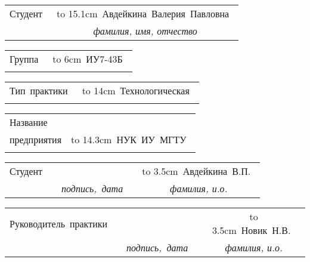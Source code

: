 {
\noindent
\begin{tabular}{@{}l@{}c}
    Студент~       & \hbox to 15.1cm{\hfill ~Авдейкина~Валерия~Павловна~ \hfill} \\\cline{2-2}
    \hspace{1.6cm} &  \textit{\footnotesize{фамилия, имя, отчество}}
\end{tabular}

\vspace{0.4cm}
\noindent
\begin{tabular}{@{}l@{}c}
    Группа~        & \hbox to 6cm{\hfill ~ИУ7-43Б~ \hfill} \\\cline{2-2}
    \hspace{1.5cm} &  \textit{\footnotesize}
\end{tabular}

\vspace{0.4cm}
\noindent
\begin{tabular}{@{}l@{}c}
    Тип~практики~  & \hbox to 14cm{\hfill ~Технологическая~ \hfill} \\\cline{2-2}
    \hspace{2.5cm} &  
\end{tabular}

\noindent
\begin{tabular}{@{}l@{}c}
    Название~      &  \\
    предприятия    &  \hbox to 14.3cm{\hfill ~НУК~ИУ~МГТУ~ \hfill} \\\cline{2-2}
    \hspace{2.5cm} &  \textit{\footnotesize}         
\end{tabular}\par}

{
\vspace{1cm}
\noindent
\begin{tabular}{@{}l c c c c}
    Студент      & \hspace{4.5cm} & \hspace{4cm}                          & &  \hbox to 3.5cm{\hfill ~Авдейкина~В.П.~ \hfill} \\\cline{3-3} \cline{5-5}
    \hspace{3cm} &                & \textit{\footnotesize{подпись,~дата}} & & \textit{\footnotesize{фамилия, и.о.}}
\end{tabular}

\vspace{0.3cm}
\noindent
\begin{tabular}{@{}l c c c c}
    Руководитель~практики & \hspace{3cm} & \hspace{4cm}                          & & \hbox to 3.5cm{\hfill ~Новик~Н.В.~ \hfill} \\\cline{3-3} \cline{5-5} 
    \hspace{3cm}          &              & \textit{\footnotesize{подпись,~дата}} & & \textit{\footnotesize{фамилия, и.о.}}
\end{tabular}\par}

